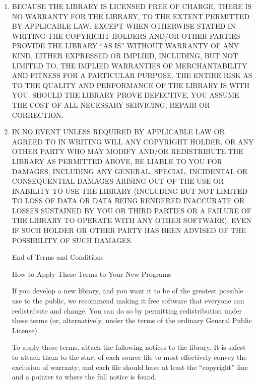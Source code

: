 \begin{enumerate}
\begin{center}
{\large \bf NO WARRANTY}
\end{center}

\item BECAUSE THE LIBRARY IS LICENSED FREE OF CHARGE, THERE IS NO
WARRANTY FOR THE LIBRARY, TO THE EXTENT PERMITTED BY APPLICABLE LAW.
EXCEPT WHEN OTHERWISE STATED IN WRITING THE COPYRIGHT HOLDERS AND/OR
OTHER PARTIES PROVIDE THE LIBRARY ``AS IS'' WITHOUT WARRANTY OF ANY
KIND, EITHER EXPRESSED OR IMPLIED, INCLUDING, BUT NOT LIMITED TO, THE
IMPLIED WARRANTIES OF MERCHANTABILITY AND FITNESS FOR A PARTICULAR
PURPOSE.  THE ENTIRE RISK AS TO THE QUALITY AND PERFORMANCE OF THE
LIBRARY IS WITH YOU.  SHOULD THE LIBRARY PROVE DEFECTIVE, YOU ASSUME
THE COST OF ALL NECESSARY SERVICING, REPAIR OR CORRECTION.

\item IN NO EVENT UNLESS REQUIRED BY APPLICABLE LAW OR AGREED TO IN
WRITING WILL ANY COPYRIGHT HOLDER, OR ANY OTHER PARTY WHO MAY MODIFY
AND/OR REDISTRIBUTE THE LIBRARY AS PERMITTED ABOVE, BE LIABLE TO YOU
FOR DAMAGES, INCLUDING ANY GENERAL, SPECIAL, INCIDENTAL OR
CONSEQUENTIAL DAMAGES ARISING OUT OF THE USE OR INABILITY TO USE THE
LIBRARY (INCLUDING BUT NOT LIMITED TO LOSS OF DATA OR DATA BEING
RENDERED INACCURATE OR LOSSES SUSTAINED BY YOU OR THIRD PARTIES OR A
FAILURE OF THE LIBRARY TO OPERATE WITH ANY OTHER SOFTWARE), EVEN IF
SUCH HOLDER OR OTHER PARTY HAS BEEN ADVISED OF THE POSSIBILITY OF SUCH
DAMAGES.

\begin{center}
{\Large\sc End of Terms and Conditions}
\end{center}

\smallskip
\begin{center}
How to Apply These Terms to Your New Programs
\end{center}

  If you develop a new library, and you want it to be of the greatest
possible use to the public, we recommend making it free software that
everyone can redistribute and change.  You can do so by permitting
redistribution under these terms (or, alternatively, under the terms of the
ordinary General Public License).

  To apply these terms, attach the following notices to the library.  It is
safest to attach them to the start of each source file to most effectively
convey the exclusion of warranty; and each file should have at least the
``copyright'' line and a pointer to where the full notice is found.


\end{enumerate}
